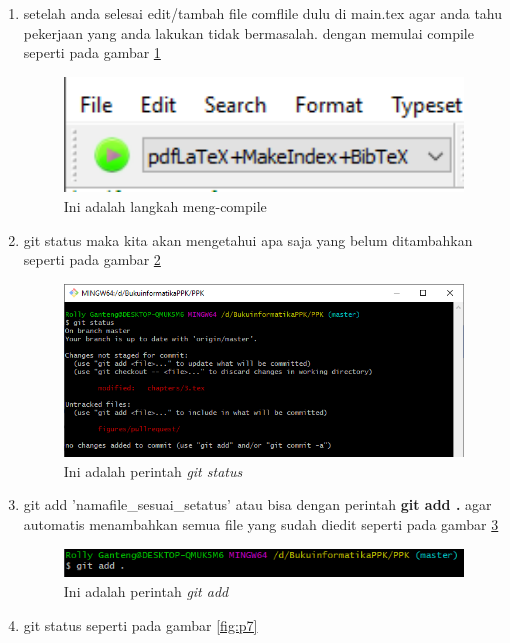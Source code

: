 \begin{enumerate}
\begin{figure}[!htbp]
		\end{figure}
\item setelah anda selesai edit/tambah file comflile dulu di main.tex agar anda tahu pekerjaan yang anda lakukan tidak bermasalah. dengan memulai compile seperti pada gambar \ref{fig:p4}
		\begin{figure}[!htbp]
		\centering
		\includegraphics[width=1\textwidth]{figures/pullrequest/p4.PNG}
		\caption{Ini adalah langkah meng-compile}
		\label{fig:p4}
		\end{figure}
\item git status maka kita akan mengetahui apa saja yang belum ditambahkan seperti pada gambar \ref{fig:p5}
		\begin{figure}[!htbp]
		\centering
		\includegraphics[width=1\textwidth]{figures/pullrequest/p5.PNG}
		\caption{Ini adalah perintah \textit{git status}}
		\label{fig:p5}
		\end{figure}
\item git add 'namafile\_sesuai\_setatus' atau bisa dengan perintah \textbf{git add .} agar automatis menambahkan semua file yang sudah diedit seperti pada gambar \ref{fig:p6}
		\begin{figure}[!htbp]
		\centering
		\includegraphics[width=1\textwidth]{figures/pullrequest/p6.PNG}
		\caption{Ini adalah perintah \textit{git add}}
		\label{fig:p6}
		\end{figure}
\item git status seperti pada gambar \ref{fig:p7}

\end{enumerate}
